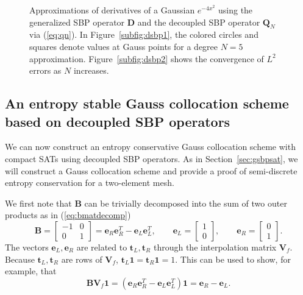 \documentclass[onefignum,onetabnum,final]{siamart171218}
\newcommand{\LRp}[1]{\left( #1 \right)}
\begin{document}
\begin{figure}
{

}

\caption{Approximations of derivatives of a Gaussian $e^{-4x^2}$ using the generalized SBP operator $\bm{D}$ and the decoupled SBP operator $\bm{Q}_N$ via (\ref{eq:qn}).  In Figure~\ref{subfig:dsbp1}, the colored circles and squares denote values at Gauss points for a degree $N = 5$ approximation.  Figure~\ref{subfig:dsbp2} shows the convergence of $L^2$ errors as $N$ increases. }
\label{fig:dsbpcorrect}
\end{figure}


\subsection{An entropy stable Gauss collocation scheme based on decoupled SBP operators}

We can now construct an entropy conservative Gauss collocation scheme with compact SATs using decoupled SBP operators.  As in Section~\ref{sec:gsbpsat}, we will construct a Gauss collocation scheme and provide a proof of semi-discrete entropy conservation for a two-element mesh.  

We first note that $\bm{B}$ can be trivially decomposed into the sum of two outer products as in (\ref{eq:bmatdecomp})
\begin{equation}
\bm{B} = \begin{bmatrix}
-1 & 0 \\
0 & 1
\end{bmatrix} = \bm{e}_R\bm{e}_R^T - \bm{e}_L\bm{e}_L^T, \qquad \bm{e}_L = \begin{bmatrix} 1\\0\end{bmatrix}, \qquad \bm{e}_R = \begin{bmatrix} 0\\1\end{bmatrix}.
\label{eq:bmatdecomp2}
\end{equation}
The vectors $\bm{e}_L, \bm{e}_R$ are related to $\bm{t}_L, \bm{t}_R$ through the interpolation matrix $\bm{V}_f$.  Because $\bm{t}_L, \bm{t}_R$ are rows of $\bm{V}_f$, $\bm{t}_L\bm{1} = \bm{t}_R\bm{1} = 1$.  This can be used to show, for example, that
\begin{equation}
\label{eq:et}
\bm{B}\bm{V}_f\bm{1} = \LRp{\bm{e}_R\bm{e}_R^T - \bm{e}_L\bm{e}_L^T}\bm{1} = \bm{e}_R-\bm{e}_L.
\end{equation}
\end{document}
